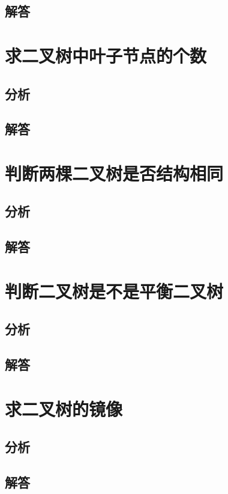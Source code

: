 \documentclass[UTF8,a4paper,12pt]{ctexbook}
\begin{document}
	\subsection{解答}
	
	
\section{求二叉树中叶子节点的个数}
	\subsection{分析}
	
	\subsection{解答}
	
\section{判断两棵二叉树是否结构相同}
	\subsection{分析}
	
	\subsection{解答}
\section{判断二叉树是不是平衡二叉树}
	\subsection{分析}
	
	\subsection{解答}
	
\section{求二叉树的镜像}
	\subsection{分析}
	
	\subsection{解答}
	
\end{document}
